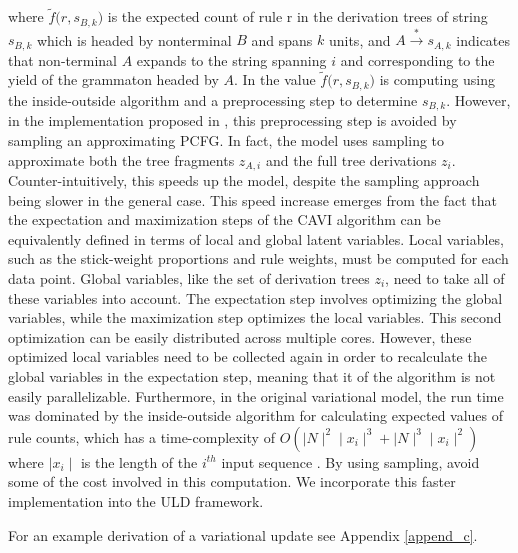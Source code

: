 \documentclass[12pt,letterpaper]{article}
\begin{document}
where $\tilde f \Big(r, s_{B,k}\Big)$ is the expected count of rule r in the derivation trees of string $s_{B,k}$ which is headed by nonterminal $B$ and spans $k$ units, and $A \overset{*}{\rightarrow} s_{A,k}$ indicates that non-terminal $A$ expands to the string spanning $i$ and corresponding to the yield of the grammaton headed by $A$. In \citet{cohen:2010} the value $\tilde f \Big(r, s_{B,k}\Big)$ is computing using the inside-outside algorithm and a preprocessing step to determine $s_{B,k}$. However, in the implementation proposed in \citet{zhai:2014}, this preprocessing step is avoided by sampling an approximating PCFG. In fact, the \citet{zhai:2014} model uses sampling to approximate both the tree fragments $z_{A,i}$ and the full tree derivations $z_i$. Counter-intuitively, this speeds up the model, despite the sampling approach being slower in the general case. This speed increase emerges from the fact that the expectation and maximization steps of the CAVI algorithm can be equivalently defined in terms of local and global latent variables. Local variables, such as the stick-weight proportions and rule weights, must be computed for each data point. Global variables, like the set of derivation trees $z_i$, need to take all of these variables into account. The expectation step involves optimizing the global variables, while the maximization step optimizes the local variables. This second optimization can be easily distributed across multiple cores. However, these optimized local variables need to be collected again in order to recalculate the global variables in the expectation step, meaning that it of the algorithm is not easily parallelizable. Furthermore, in the original variational model, the run time was dominated by the inside-outside algorithm for calculating expected values of rule counts, which has a time-complexity of $O(\mid N \mid^2 \mid x_i \mid^3 + \mid N \mid^3\mid x_i\mid^2)$ where $\mid x_i \mid$ is the length of the $i^{th}$ input sequence \citep{cohen:2010}. By using sampling, \citet{zhai:2014} avoid some of the cost involved in this computation. We incorporate this faster implementation into the ULD framework.

 For an example derivation of a variational update see Appendix \ref{append_c}. 
\end{document}

